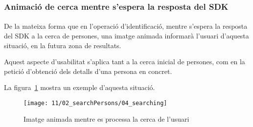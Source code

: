 \subsubsection{Animació de cerca mentre s'espera la resposta del SDK}

\paragraph{}
De la mateixa forma que en l'operació d'identificació, mentre s'espera la resposta del SDK a la cerca de persones, una imatge animada informarà l'usuari d'aquesta situació, en la futura zona de resultats.

Aquest aspecte d'usabilitat s'aplica tant a la cerca inicial de persones, com en la petició d'obtenció dels detalls d’una persona en concret.

La figura~\ref{fig:pSearchLoading} mostra un exemple d'aquesta situació.

\begin{figure}[h]
    \texttt{[image: 11/02\_searchPersons/04\_searching]}
    \centering
    \caption{Imatge animada mentre es processa la cerca de l'usuari}\label{fig:pSearchLoading}
\end{figure}

